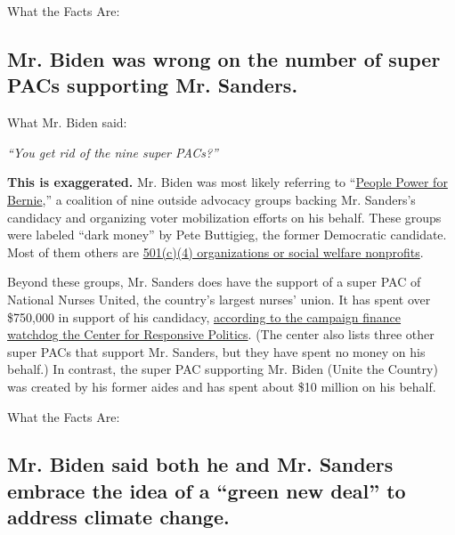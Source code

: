 What the Facts Are:

\hypertarget{mr-biden-was-wrong-on-the-number-of-super-pacs-supporting-mr-sanders}{%
\subsection{Mr. Biden was wrong on the number of super PACs supporting
Mr.
Sanders.}\label{mr-biden-was-wrong-on-the-number-of-super-pacs-supporting-mr-sanders}}

What Mr. Biden said:

\emph{``You get rid of the nine super PACs?''}

\textbf{This is exaggerated.} Mr. Biden was most likely referring to
``\href{https://slack-redir.net/link?url=https\%3A\%2F\%2Fpeoplesaction.org\%2F2020\%2F01\%2Fnine-groups-that-endorsed-sanders-join-forces-to-drive-black-brown-working-class-and-young-voter-turnout-in-primaries\%2F}{People
Power for Bernie},'' a coalition of nine outside advocacy groups backing
Mr. Sanders's candidacy and organizing voter mobilization efforts on his
behalf. These groups were labeled ``dark money'' by Pete Buttigieg, the
former Democratic candidate. Most of them others are
\href{https://www.nytimes.com/2020/02/18/us/politics/pete-buttigieg-fact-check.html}{501(c)(4)
organizations or social welfare nonprofits}.

Beyond these groups, Mr. Sanders does have the support of a super PAC of
National Nurses United, the country's largest nurses' union. It has
spent over \$750,000 in support of his candidacy,
\href{https://www.opensecrets.org/outsidespending/summ.php?chrt=V\&type=S}{according
to the campaign finance watchdog the Center for Responsive Politics}.
(The center also lists three other super PACs that support Mr. Sanders,
but they have spent no money on his behalf.) In contrast, the super PAC
supporting Mr. Biden (Unite the Country) was created by his former aides
and has spent about \$10 million on his behalf.

What the Facts Are:

\hypertarget{mr-biden-said-both-he-and-mr-sanders-embrace-the-idea-of-a-green-new-deal-to-address-climate-change}{%
\subsection{Mr. Biden said both he and Mr. Sanders embrace the idea of a
``green new deal'' to address climate
change.}\label{mr-biden-said-both-he-and-mr-sanders-embrace-the-idea-of-a-green-new-deal-to-address-climate-change}}

